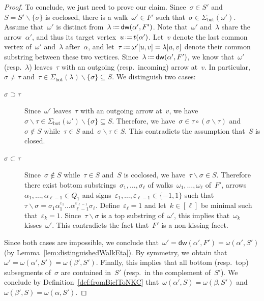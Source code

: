 \documentclass{amsart}
\theoremstyle{definition}
\newcommand{\ssm}{\smallsetminus} %
\newcommand{\eqdef}{\mbox{\,\raisebox{0.2ex}{\scriptsize\ensuremath{\mathrm:}}\ensuremath{=}\,}} %
\newcommand{\distinguishedWalk}[2]{\mathsf{dw}(#1,#2)} %
\newcommand{\bottom}{\mathrm{bot}} %
\begin{document}
\begin{proof}
To conclude, we just need to prove our claim.
Since~$\sigma \in S'$ and~$S = S' \ssm \{\sigma\}$ is coclosed, there is a walk~$\omega' \in F'$ such that~$\sigma \in \Sigma_\bottom(\omega')$.
Assume that~$\omega'$ is distinct from~$\lambda \eqdef \distinguishedWalk{\alpha'}{F'}$.
Note that~$\omega'$ and~$\lambda$ share the arrow~$\alpha'$, and thus its target vertex~$u \eqdef t(\alpha')$.
Let~$v$ denote the last common vertex of~$\omega'$ and~$\lambda$ after~$\alpha$, and let~$\tau \eqdef \omega'[u,v] = \lambda[u,v]$ denote their common substring between these two vertices.
Since~$\lambda \eqdef \distinguishedWalk{\alpha'}{F'}$, we know that~$\omega'$ (resp.~$\lambda$) leaves~$\tau$ with an outgoing (resp.~incoming) arrow at~$v$.
In particular, $\sigma \ne \tau$ and~$\tau \in \Sigma_\bottom(\lambda) \ssm \{\sigma\} \subseteq S$.
We distinguish two cases:
\begin{description}
\item[$\sigma \supset \tau$] Since~$\omega'$ leaves~$\tau$ with an outgoing arrow at~$v$, we have~$\sigma \ssm \tau \in \Sigma_\bottom(\omega') \ssm \{\sigma\} \subseteq S$. Therefore, we have~$\sigma \in \tau \circ (\sigma \ssm \tau)$ and~$\sigma \notin S$ while~$\tau \in S$ and~$\sigma \ssm \tau \in S$. This contradicts the assumption that~$S$ is closed.
\item[$\sigma \subset \tau$] Since~$\sigma \notin S$ while~$\tau \in S$ and~$S$ is coclosed, we have~$\tau \ssm \sigma \in S$. Therefore there exist bottom substrings~$\sigma_1, \dots, \sigma_\ell$ of walks~$\omega_1, \dots, \omega_\ell$ of~$F'$, arrows~$\alpha_1, \dots, \alpha_{\ell-1} \in Q_1$ and signs~$\varepsilon_1, \dots, \varepsilon_{\ell-1} \in \{-1,1\}$ such that~$\tau \ssm \sigma = \sigma_1 \alpha_1^{\varepsilon_1} \dots \alpha_{\ell-1}^{\varepsilon_{\ell-1}} \sigma_\ell$. Define~$\varepsilon_\ell = 1$ and let~$k \in [\ell]$ be minimal such that~$\varepsilon_k = 1$. Since~$\tau \ssm \sigma$ is a top substring of~$\omega'$, this implies that~$\omega_k$ kisses~$\omega'$. This contradicts the fact that~$F'$ is a non-kissing facet.
\end{description}
Since both cases are impossible, we conclude that~$\omega' = \distinguishedWalk{\alpha'}{F'} = \omega(\alpha', S')$ (by Lemma~\ref{lem:distinguishedWalkEta}).
By symmetry, we obtain that~$\omega' = \omega(\alpha', S') = \omega(\beta', S')$.
Finally, this implies that all bottom (resp.~top) subsegments of~$\sigma$ are contained in~$S'$ (resp.~in the complement of~$S'$).
We conclude by Definition~\ref{def:fromBiclToNKC} that~$\omega(\alpha', S) = \omega(\beta, S')$ and~$\omega(\beta', S) = \omega(\alpha, S')$.
\end{proof}
\end{document}
